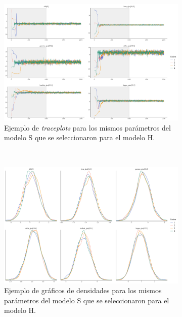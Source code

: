  \begin{figure}[h]
	\centering
	\begin{subfigure}{0.45\textwidth}
	\includegraphics[width = \textwidth]{Figs/Convergencia/Convergencia_Traceplots_s}
	\caption{Ejemplo de \textit{traceplots} para los mismos parámetros del modelo S que se seleccionaron para el modelo H.}
	\label{fig:Traceplots_S}
	\end{subfigure}
	~
	\begin{subfigure}{0.45\textwidth}
	\includegraphics[width = \textwidth]{Figs/Convergencia/Convergencia_Densidades_S}
	\caption{Ejemplo de gráficos de densidades para los mismos parámetros del modelo S que se seleccionaron para el modelo H.}
	\label{fig:Densidades_S}
	\end{subfigure}
	~
	\begin{subfigure}{0.6\textwidth}

\end{subfigure}
\end{figure}
